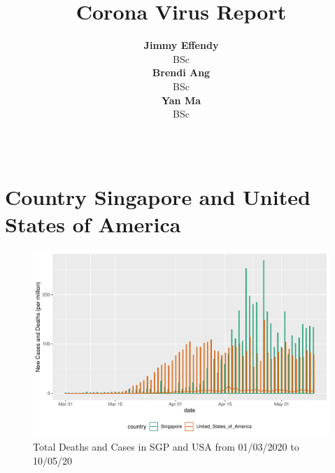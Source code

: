 \documentclass[11pt,a4paper,]{article}
\title{Corona Virus Report}
\author{\sf\Large\textbf{ Jimmy Effendy}\\ {\sf\large BSc\\[0.5cm]} \sf\Large\textbf{ Brendi Ang}\\ {\sf\large BSc\\[0.5cm]} \sf\Large\textbf{ Yan Ma}\\ {\sf\large BSc\\[0.5cm]}}
\date{\sf\Date~\Month~\Year}
\makeatletter
\def\titlepage{\front{\expandafter{\@title}}{\@author}{\@organization}}
\makeatother
\begin{document}
\titlepage

\section*{Country Singapore and United States of America}

\begin{figure}
\centering
\includegraphics{report_files/figure-latex/sgp-usa-barchart-1.pdf}
\caption{\label{fig:sgp-usa-barchart}Total Deaths and Cases in SGP and USA from 01/03/2020 to 10/05/20}
\end{figure}
\end{document}
